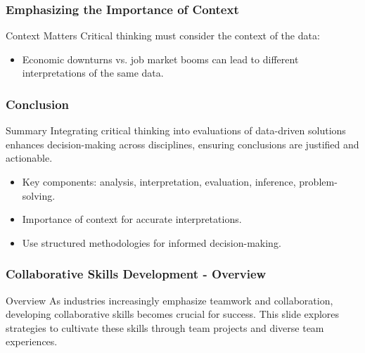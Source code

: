 \documentclass[aspectratio=169]{beamer}
\begin{document}
\begin{frame}[fragile]
    \frametitle{Emphasizing the Importance of Context}
    \begin{block}{Context Matters}
        Critical thinking must consider the context of the data:
        \begin{itemize}
            \item Economic downturns vs. job market booms can lead to different interpretations of the same data.
        \end{itemize}
    \end{block}
\end{frame}

\begin{frame}[fragile]
    \frametitle{Conclusion}
    \begin{block}{Summary}
        Integrating critical thinking into evaluations of data-driven solutions enhances decision-making across disciplines, ensuring conclusions are justified and actionable.
    \end{block}
    \begin{itemize}
        \item Key components: analysis, interpretation, evaluation, inference, problem-solving.
        \item Importance of context for accurate interpretations.
        \item Use structured methodologies for informed decision-making.
    \end{itemize}
\end{frame}

\begin{frame}[fragile]
    \frametitle{Collaborative Skills Development - Overview}
    \begin{block}{Overview}
        As industries increasingly emphasize teamwork and collaboration, developing collaborative skills becomes crucial for success. 
        This slide explores strategies to cultivate these skills through team projects and diverse team experiences.
    \end{block}
\end{frame}
\end{document}
